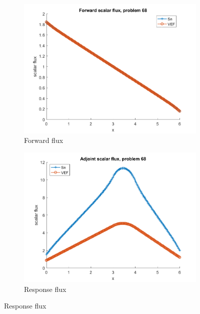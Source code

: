 \documentclass{article}
\begin{document}
\begin{figure}[H]
\label{Case68Flux}
\centering
\begin{subfigure}{.5\textwidth}
  \centering
  \includegraphics[width=.98\linewidth]{IanProposal/figures2/68phi.png}
  \caption{Forward flux}
  \label{fig:sfig1}
\end{subfigure}%
\begin{subfigure}{.5\textwidth}
  \centering
  \includegraphics[width=.98\linewidth]{IanProposal/figures2/68phia.png}
  \caption{Response flux}
  \label{fig:sfig4}
\end{subfigure}%
\end{figure}
\end{document}
